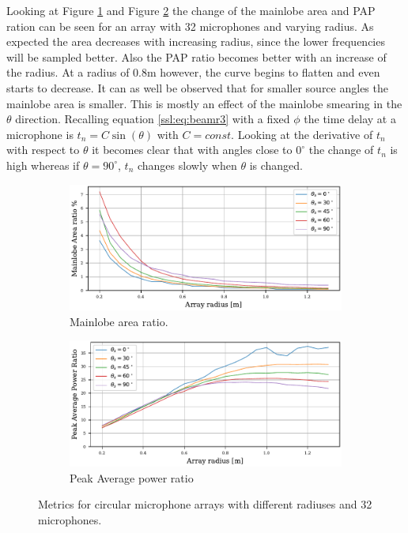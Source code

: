 Looking at Figure \ref*{aev:fig:areaCirc} and Figure \ref*{aev:fig:papCirc}
the change of the mainlobe area and PAP ration can be seen for
an array with 32 microphones and varying radius.
As expected the area decreases with increasing radius, since the lower frequencies will be
sampled better.
Also the PAP ratio becomes better with an increase of the radius.
At a radius of 0.8m however, the curve begins to flatten and even starts to decrease.
It can as well be observed that for smaller source angles the mainlobe area is smaller.
This is mostly an effect of the mainlobe smearing in the $\theta$ direction.
Recalling equation \eqref{ssl:eq:beamr3} with a fixed $\phi$
the time delay at a microphone is $t_n = C \sin(\theta)$ with $C=const$.
Looking at the derivative of $t_n$ with respect to $\theta$ it becomes
clear that with angles close to $0^\circ$ the change of $t_n$ is high
whereas if $\theta = 90^\circ$, $t_n$ changes slowly when $\theta$ is 
changed.
\begin{figure}[h!]
	\centering
	\begin{subfigure}[b]{1\textwidth}
		\centering
		\includegraphics[]{images/5_array_evaluation/area_circ.pdf}
		\caption{Mainlobe area ratio.}
		\label{aev:fig:areaCirc}
	\end{subfigure}
	\begin{subfigure}[b]{1\textwidth}
		\centering
		\includegraphics[]{images/5_array_evaluation/PAP_circ.pdf}
		\caption{Peak Average power ratio}
		\label{aev:fig:papCirc}
	\end{subfigure}
	\caption{Metrics for circular microphone arrays with different radiuses and 32 microphones.}
	\label{aev:fig:metrCirc}
\end{figure}

